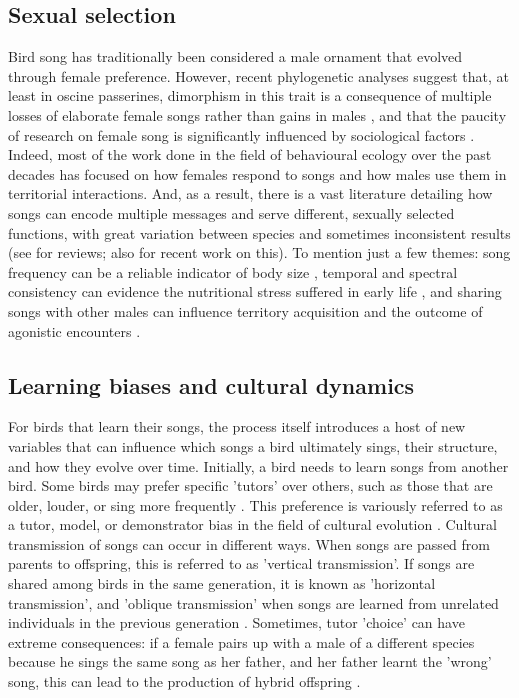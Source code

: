 \subsection{Sexual selection}
Bird song has traditionally been considered a male ornament that evolved through female preference. However, recent phylogenetic analyses suggest that, at least in oscine passerines, dimorphism in this trait is a consequence of multiple losses of elaborate female songs rather than gains in males \autocite{odom2014,odom2018}, and that the paucity of research on female song is significantly influenced by sociological factors \autocite{haines2020}. Indeed, most of the work done in the field of behavioural ecology over the past decades has focused on how females respond to songs and how males use them in territorial interactions. And, as a result, there is a vast literature detailing how songs can encode multiple messages and serve different, sexually selected functions, with great variation between species and sometimes inconsistent results (see \cite{catchpole2008} for reviews; also \cite{sierro2023} for recent work on this). To mention just a few themes: song frequency can be a reliable indicator of body size \autocite{ryan1985}, temporal and spectral consistency can evidence the nutritional stress suffered in early life \autocite{macdonald2006}, and sharing songs with other males can influence territory acquisition and the outcome of agonistic encounters \autocite{Demko2016a,krebs1978}.

\subsection{Learning biases and cultural dynamics}
For birds that learn their songs, the process itself introduces a host of new variables that can influence which songs a bird ultimately sings, their structure, and how they evolve over time. Initially, a bird needs to learn songs from another bird. Some birds may prefer specific 'tutors' over others, such as those that are older, louder, or sing more frequently \autocite{Greig2012}. This preference is variously referred to as a tutor, model, or demonstrator bias in the field of cultural evolution \autocite{kendal2015,VanDeWaal2010}. Cultural transmission of songs can occur in different ways. When songs are passed from parents to offspring, this is referred to as 'vertical transmission'. If songs are shared among birds in the same generation, it is known as 'horizontal transmission', and 'oblique transmission' when songs are learned from unrelated individuals in the previous generation \autocite{cavalli-sforza1982,ram2018}. Sometimes, tutor 'choice' can have extreme consequences: if a female pairs up with a male of a different species because he sings the same song as her father, and her father learnt the 'wrong' song, this can lead to the production of hybrid offspring \autocite{grant1997,grant1997a}.

